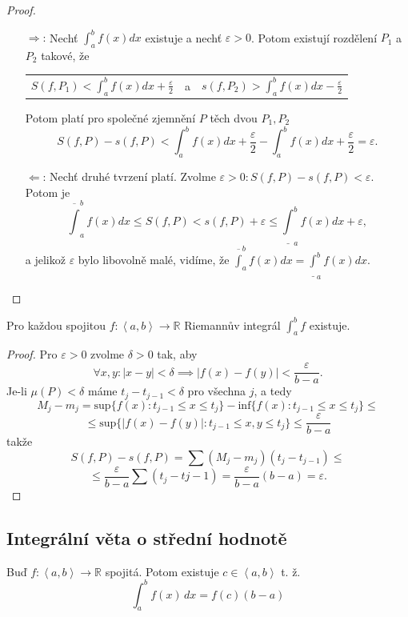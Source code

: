 \documentclass[../main.tex]{subfiles}
\begin{document}
\begin{proof}
	\begin{enumerate}
		\item[$\Rightarrow$:] Nechť $\int^b_a f(x) dx$ existuje a nechť $\varepsilon > 0$. Potom existují rozdělení $P_1$ a $P_2$ takové, že
	    \begin{center}
	        \begin{tabular}{ c c c }
	            $S(f,P_1) < \int^b_a f(x) dx + \frac{\varepsilon}{2}$ & a & $s(f,P_2) > \int^b_a f(x) dx - \frac{\varepsilon}{2}$  \\
	        \end{tabular}
	    \end{center}
	    Potom platí pro společné zjemnění $P$ těch dvou $P_1,P_2$
	    \[S(f,P) - s(f,P) < \int^b_a f(x)dx + \frac{\varepsilon}{2} - \int^b_a f(x)dx + \frac{\varepsilon}{2} = \varepsilon.\]
	    \item[$\Leftarrow$:] Nechť druhé tvrzení platí. Zvolme $\varepsilon > 0 : S(f,P) - s(f,P) < \varepsilon.$ Potom je 
	    \[\overline{\int}^b_a f(x)dx \leq S(f,P) < s(f,P) + \varepsilon \leq \underline{\int}^b_a f(x)dx + \varepsilon,\]
	    a jelikož $\varepsilon$ bylo libovolně malé, vidíme, že $\overline{\int}^b_a f(x)dx = \underline{\int}^b_a f(x)dx.$
	\end{enumerate}
\end{proof}

\begin{theorem}
	Pro každou spojitou $f : \left<a,b\right> \rightarrow \mathbb{R}$ Riemannův integrál $\int^b_a f$ existuje.
\end{theorem}

\begin{proof}
	Pro $\varepsilon > 0 $ zvolme $\delta > 0$ tak, aby 
	\[\forall x,y : |x-y| < \delta \implies |f(x) - f(y)| < \frac{\varepsilon}{b-a}.\]
	Je-li $\mu(P) < \delta$ máme $t_j-t_{j-1} < \delta$ pro všechna $j$, a tedy
	\[M_j - m_j = \text{sup}\{f(x) : t_{j-1} \leq x \leq t_j\} - \text{inf}\{f(x) : t_{j-1} \leq x \leq t_j\} \leq\]
	\[\leq \text{sup}\{|f(x) - f(y)| : t_{j-1} \leq x,y \leq t_j\} \leq \frac{\varepsilon}{b-a}\]
	takže
	\[S(f,P) - s(f,P) = \sum (M_j - m_j)(t_j-t_{j-1})\leq\]
	\[\leq \frac{\varepsilon}{b-a}\sum (t_j-t{j-1}) = \frac{\varepsilon}{b-a}(b-a) = \varepsilon.\]
\end{proof}

\subsection{Integrální věta o střední hodnotě}
\begin{theorem}
	Buď $f: \left< a,b \right> \to \mathbb{R}$ spojitá. Potom existuje $c \in \left< a,b \right>$ t. ž.
	\[ \int_{a}^{b} f(x) \,dx = f(c)(b-a)\]
\end{theorem}
\end{document}
